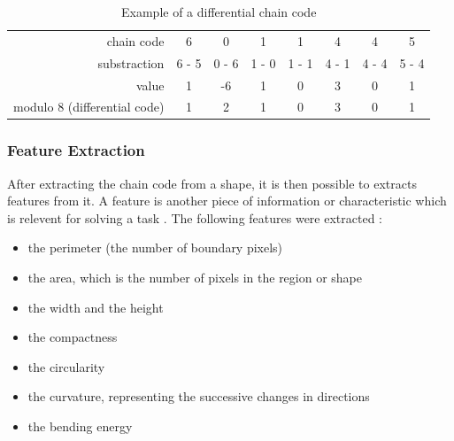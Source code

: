\begin{table}[h]
	\centering
	\caption{Example of a differential chain code}
	\label{tab:chain code:differential chain code}
	\begin{tabular}{rccccccc}
\toprule 
chain code   & 6     & 0     & 1     & 1     & 4     & 4     & 5     \\
substraction & 6 - 5 & 0 - 6 & 1 - 0 & 1 - 1 & 4 - 1 & 4 - 4 & 5 - 4 \\
value     	 & 1     & -6    & 1     & 0     & 3     & 0     & 1     \\
modulo 8 (differential code)  	 & 1     & 2     & 1     & 0     & 3     & 0     & 1     \\ 
\bottomrule 
	\end{tabular}
\end{table}



\subsubsection{Feature Extraction}


After extracting the chain code from a shape, it is then possible to extracts features from it. A feature is another piece of information or characteristic which is relevent for solving a task \cite{bib:extraction:definition}. The following features were extracted : 
\begin{itemize}
	\item the perimeter (the number of boundary pixels)
	\item the area, which is the number of pixels in the region or shape 
	\item the width and the height 
	\item the compactness 
	\item the circularity 
	\item the curvature, representing the successive changes in directions 
	\item the bending energy 
\end{itemize}

